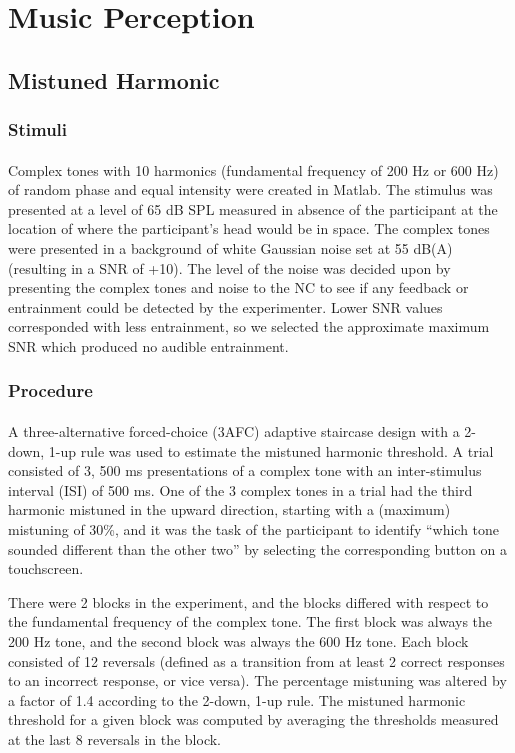 \section{Music Perception}
\subsection{Mistuned Harmonic}
\subsubsection{Stimuli}
\paragraph{}Complex tones with 10 harmonics (fundamental frequency of 200 Hz or 600 Hz) of random phase and equal intensity were created in Matlab.  The stimulus was presented at a level of 65 dB SPL measured in absence of the participant at the location of where the participant's head would be in space.  The complex tones were presented in a background of white Gaussian noise set at 55 dB(A) (resulting in a SNR of +10).  The level of the noise was decided upon by presenting the complex tones and noise to the NC to see if any feedback or entrainment could be detected by the experimenter.  Lower SNR values corresponded with less entrainment, so we selected the approximate maximum SNR which produced no audible entrainment.
\subsubsection{Procedure}
\paragraph{}A three-alternative forced-choice (3AFC) adaptive staircase design \cite{Levitt1971} with a 2-down, 1-up rule was used to estimate the mistuned harmonic threshold.  A trial consisted of 3, 500 ms presentations of a complex tone with an inter-stimulus interval (ISI) of 500 ms.  One of the 3 complex tones in a trial had the third harmonic mistuned in the upward direction, starting with a (maximum) mistuning of 30\%, and it was the task of the participant to identify ``which tone sounded different than the other two'' by selecting the corresponding button on a touchscreen.

There were 2 blocks in the experiment, and the blocks differed with respect to the fundamental frequency of the complex tone.  The first block was always the 200 Hz tone, and the second block was always the 600 Hz tone.  Each block consisted of 12 reversals (defined as a transition from at least 2 correct responses to an incorrect response, or vice versa).  The percentage mistuning was altered by a factor of 1.4 according to the 2-down, 1-up rule.  The mistuned harmonic threshold for a given block was computed by averaging the thresholds measured at the last 8 reversals in the block.

